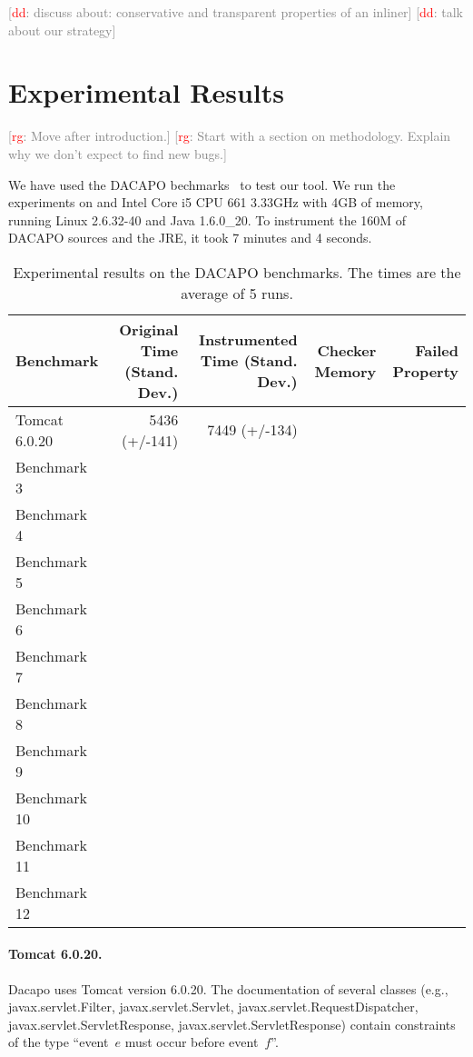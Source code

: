 \documentclass{sigplanconf}[10pt] %
\newcommand{\noterg}[2]{\textcolor{gray}{[\textcolor{red}{#1}: #2]}}
\newcommand{\rg}[1]{\noterg{rg}{#1}}
\newcommand{\dd}[1]{\noterg{dd}{#1}}
\newcommand{\dinocomment}[1]{\dd{#1}}
\begin{document}
\dinocomment{discuss about: conservative and transparent properties of an inliner}
\dinocomment{talk about our strategy}

\section{Experimental Results} %

\rg{Move after introduction.}
\rg{Start with a section on methodology.
Explain why we don't expect to find new bugs.}

We have used the DACAPO bechmarks~\cite{dblp:conf/oopsla/dacapo} to test our tool.
We run the experiments on and Intel  Core i5 CPU  661  \@ 3.33GHz with 4GB of memory, running
 Linux 2.6.32-40 and  Java 1.6.0\_20.
To instrument the 160M of DACAPO sources and the JRE, it took  7 minutes and 4 seconds.

\begin{table*}[t]
      \centering
   \begin{tabular}{| l | r | r | r | r | }
   \hline
  Benchmark  & Original Time (Stand. Dev.) & Instrumented Time (Stand. Dev.) & Checker Memory & Failed Property
\\ \hline \hline
Tomcat 6.0.20 &  5436 (+/-141) & 7449 (+/-134) & &
\\ \hline
Benchmark 3 & & &  &
\\ \hline
Benchmark 4 & & &  &
\\ \hline
Benchmark 5 & & &  &
\\ \hline
Benchmark 6 & & &  &
\\ \hline
Benchmark 7 & & &  &
\\ \hline
Benchmark 8 & & &  &
\\ \hline
Benchmark 9 & & &  &
\\ \hline
Benchmark 10 & & &  &
\\ \hline
Benchmark 11 & & &  &
\\ \hline
Benchmark 12 & & &  &
\\ \hline
\end{tabular}
    \caption{Experimental results on the DACAPO benchmarks. The times are the average of 5 runs.}
   \label{tab:booktabs}
\end{table*}

\paragraph{Tomcat 6.0.20.}
Dacapo uses Tomcat version 6.0.20. The documentation of several classes (e.g., \textsf{javax.servlet.Filter}, \textsf{javax.servlet.Servlet}, \textsf{javax.servlet.RequestDispatcher}, \textsf{javax.servlet.ServletResponse}, \textsf{javax.servlet.ServletResponse}) contain constraints of the type ``event~$e$ must occur before event~$f$''.
\end{document}
